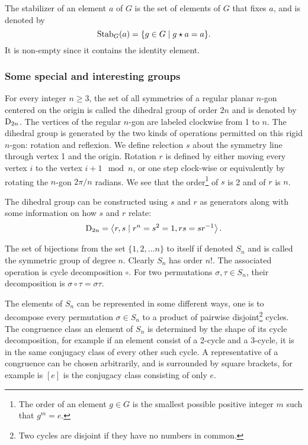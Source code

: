 \begin{definition}[Stabilizer]
	The stabilizer of an element $a$ of $G$ is the set of elements of $G$ that fixes $a$, and is denoted by 
	\[
	\text{Stab}_G(a) = \{ g \in G \mid g \star a = a \}.
	\]
	It is non-empty since it contains the identity element.
\end{definition}

\subsubsection{Some special and interesting groups}

\begin{definition}
	For every integer $n \geq 3$, the set of all symmetries of a regular planar $n$-gon centered on the origin is called the dihedral group of order $2n$ and is denoted by $\text{D}_{2n}$. The vertices of the regular $n$-gon are labeled clockwise from 1 to $n$. The dihedral group is generated by the two kinds of operations permitted on this rigid $n$-gon: rotation and reflexion. We define relection $s$ about the symmetry line through vertex 1 and the origin. Rotation $r$ is defined by either moving every vertex $i$ to the vertex $i+1 \mod n$, or one step clock-wise or equivalently by rotating the $n$-gon $2 \pi /n$ radians. We see that the order\footnote{The order of an element $g \in G$ is the smallest possible positive integer $m$ such that $g^m = e$.} of $s$ is 2 and of $r$ is $n$.
	
	The dihedral group can be constructed using $s$ and $r$ as generators along with some information on how $s$ and $r$ relate:
	$$ \text{D}_{2n} = \left\langle r, s \mid r^n = s^2 = 1, rs = sr^{-1} \right\rangle.$$
\end{definition}

\begin{definition}
	The set of bijections from the set $\{1, 2, \dots n\}$ to itself if denoted $S_n$ and is called the symmetric group of degree $n$. Clearly $S_n$ has order $n!$. The associated operation is cycle decomposition $\circ$. For two permutations $\sigma, \tau \in S_n$, their decomposition is $\sigma \circ \tau = \sigma \tau$.
\end{definition}

The elements of $S_n$ can be represented in some different ways, one is to decompose every permutation $\sigma \in S_n$ to a product of pairwise disjoint\footnote{Two cycles are disjoint if they have no numbers in common.} cycles. The congruence class an element of $S_n$ is determined by the shape of its cycle decomposition, for example if an element consist of a 2-cycle and a 3-cycle, it is in the same conjugacy class of every other such cycle. A representative of a congruence can be chosen arbitrarily, and is surrounded by square brackets, for example is $\left[ e \right]$ is the conjugacy class consisting of only $e$.


